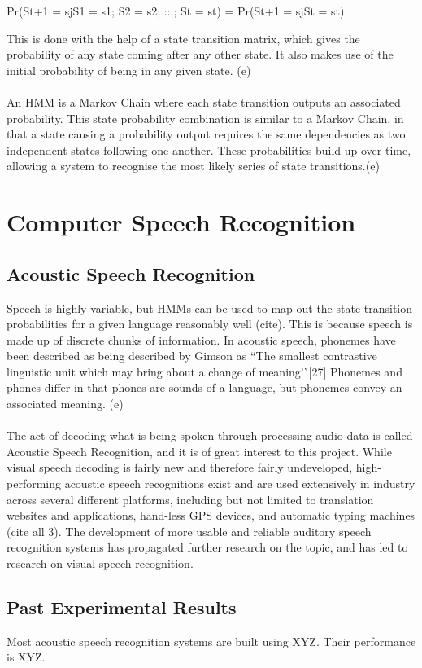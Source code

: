 \documentclass[12pt,twoside]{report}
\begin{document}
Pr(St+1 = sjS1 = s1; S2 = s2; :::; St = st) = Pr(St+1 = sjSt = st)

This is done with the help of a state transition matrix, which gives the probability of any state coming after any other state. It also makes use of the initial probability of being in any given state. (e) 
\\ \\
An HMM is a Markov Chain where each state transition outputs an associated probability. This state probability combination is similar to a Markov Chain, in that a state causing a probability output requires the same dependencies as two independent states following one another. These probabilities build up over time, allowing a system to recognise the most likely series of state transitions.(e)

	\section{Computer Speech Recognition}
		\subsection{Acoustic Speech Recognition}

Speech is highly variable, but HMMs can be used to map out the state transition probabilities for a given language reasonably well (cite). This is because speech is made up of discrete chunks of information. In acoustic speech, phonemes have been described as being described by Gimson as ``The smallest contrastive linguistic unit which may bring about a change of meaning’’.[27] Phonemes and phones differ in that phones are sounds of a language, but phonemes convey an associated meaning. (e) 
\\ \\
The act of decoding what is being spoken through processing audio data is called Acoustic Speech Recognition, and it is of great interest to this project. While visual speech decoding is fairly new and therefore fairly undeveloped, high-performing acoustic speech recognitions exist and are used extensively in industry across several different platforms, including but not limited to translation websites and applications, hand-less GPS devices, and automatic typing machines (cite all 3). The development of more usable and reliable auditory speech recognition systems has propagated further research on the topic, and has led to research on visual speech recognition. 

	\subsection{Past Experimental Results}
Most acoustic speech recognition systems are built using XYZ. Their performance is XYZ.
\end{document}
